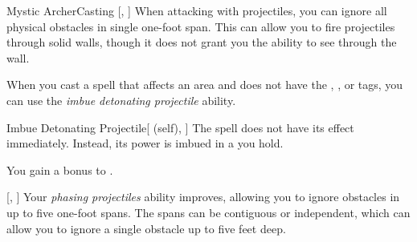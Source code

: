 \begin{feat}{Mystic Archer}{Casting}
        [, ] When attacking with projectiles, you can ignore all physical obstacles in single one-foot span.
        This can allow you to fire projectiles through solid walls, though it does not grant you the ability to see through the wall.

         When you cast a spell that affects an area and does not have the , , or  tags,
            you can use the \textit{imbue detonating projectile} ability.
        \begin{attuneability}{Imbue Detonating Projectile}[ (self), ]
            The spell does not have its effect immediately.
            Instead, its power is imbued in a  you hold.
        \end{attuneability}

         You gain a  bonus to .

        [, ] Your \textit{phasing projectiles} ability improves, allowing you to ignore obstacles in up to five one-foot spans.
        The spans can be contiguous or independent, which can allow you to ignore a single obstacle up to five feet deep.
    \end{feat}

